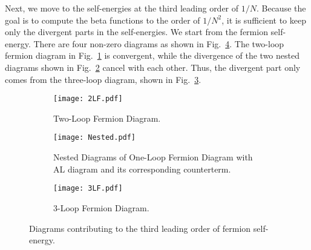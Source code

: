 \documentclass[prx,amsmath,amssymb, notitlepage, onecolumn,
nofootinbib,
superscriptaddress,
longbibliography
]{revtex4-1}
\begin{document}
Next, we move to the self-energies at the third leading order of $1/N$. 
Because the goal is to compute the beta functions to the order of $1/N^2$, it is sufficient to keep only the divergent parts in the self-energies.
We start from the fermion self-energy. There are four non-zero diagrams as shown in Fig.~\ref{FD: all fermion 1/N2 diagrams}. The two-loop fermion diagram in Fig.~\ref{FD: 2LF} is convergent, while the divergence of the two nested diagrams shown in Fig.~\ref{FD: Nested} cancel with each other. Thus, the divergent part only comes from the three-loop diagram, shown in Fig.~\ref{FD: 3LF}. 
\begin{figure}[!htbp]
     \centering
     \begin{subfigure}[h]{0.34\textwidth}
     	\centering
     	\texttt{[image: 2LF.pdf]}
     	\caption{Two-Loop Fermion Diagram.}
     	\label{FD: 2LF}
     \end{subfigure}
     \begin{subfigure}[h]{0.65\textwidth}
         \centering
         \texttt{[image: Nested.pdf]}
         \caption{Nested Diagrams of One-Loop Fermion Diagram with AL diagram and its corresponding counterterm.}
         \label{FD: Nested}
     \end{subfigure}
     \hfill
     \begin{subfigure}[h]{0.5\textwidth}
         \centering
         \texttt{[image: 3LF.pdf]}
         \caption{3-Loop Fermion Diagram.}
         \label{FD: 3LF}
     \end{subfigure}
        \caption{Diagrams contributing to the third leading order of fermion self-energy.  }
        \label{FD: all fermion 1/N2 diagrams}
\end{figure}
\end{document}
